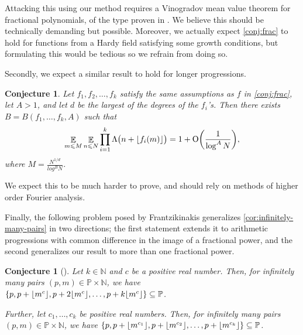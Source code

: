 \documentclass[letterpaper, 12pt]{article}
\theoremstyle{plain}
\newtheorem{Conjecture}[Theorem]{Conjecture}
\theoremstyle{definition}
\theoremstyle{plain}
\theoremstyle{plain}
\numberwithin{equation}{section}
\newcommand{\Oh}{{\rm O}}
\newcommand{\N}{\mathbb{N}}
\renewcommand{\leq}{\leqslant}
\renewcommand{\P}{\mathbb{P}}
\newcommand{\E}{\mathbb{E}}
\newcommand{\1}{\textbf{1}}
\DeclarePairedDelimiter\floor{\lfloor}{\rfloor}
\begin{document}
Attacking this using our method requires a Vinogradov mean value theorem for fractional polynomials, of the type proven in \cite{poulias2021}. We believe this should be technically demanding but possible. Moreover, we actually expect \cref{conj:frac} to hold for functions from a Hardy field satisfying some growth conditions, but formulating this would be tedious so we refrain from doing so.

Secondly, we expect a similar result to hold for longer progressions.

\begin{Conjecture}
    Let $f_1, f_2, \ldots, f_k$ satisfy the same assumptions as $f$ in \cref{conj:frac}, let $A > 1$, and let $d$ be the largest of the degrees of the $f_i$'s. Then there exists $B = B(f_1, \ldots, f_k, A)$ such that 
    \[
        \mathop{\E}_{m \leq M} \mathop{\E}_{n \leq N} \prod_{i = 1}^k \Lambda\bigl(n + \floor{f_i(m)}\bigr) 
        = 1 + \Oh\biggl(\frac{1}{\log^A N} \biggr),
    \] 
    where $M = \frac{N^{1/d}}{log^{B} N}$.
\end{Conjecture}

We expect this to be much harder to prove, and should rely on methods of higher order Fourier analysis. 

Finally, the following problem posed by Frantzikinakis generalizes \cref{cor:infinitely-many-pairs} in two directions; the first statement extends it to arithmetic progressions with common difference in the image of a fractional power, and the second generalizes our result to more than one fractional power.

\begin{Conjecture}[]
Let $k \in \N$ and $c$ be a positive real number. Then, for infinitely many pairs $(p, m) \in \P \times \N$, we have $\{p, p + \floor{m^c}, p + 2\floor{m^c}, \ldots, p + k\floor{m^c}\} \subseteq \P$. 

Further, let $c_1, \ldots, c_k$ be positive real numbers. Then, for infinitely many pairs $(p, m) \in \P \times \N$, we have $\{ p, p + \floor{m^{c_1}}, p + \floor{m^{c_2}}, \ldots, p + \floor{m^{c_k}} \} \subseteq \P$.
\end{Conjecture}

\printbibliography
\end{document}
